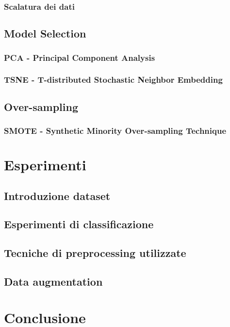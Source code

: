 \documentclass[12pt, twoside, letterpaper]{article}
\begin{document}
			\subsubsection{Scalatura dei dati}
		\subsection{Model Selection}			
			\subsubsection{PCA - Principal Component Analysis}
			\subsubsection{TSNE - T-distributed Stochastic Neighbor Embedding}
		\subsection{Over-sampling}
			\subsubsection{SMOTE - Synthetic Minority Over-sampling Technique}
		
	\section{Esperimenti}
		\subsection{Introduzione dataset}
		\subsection{Esperimenti di classificazione}
		\subsection{Tecniche di preprocessing utilizzate}
		\subsection{Data augmentation}

	\section*{Conclusione}	
	
\end{document}
